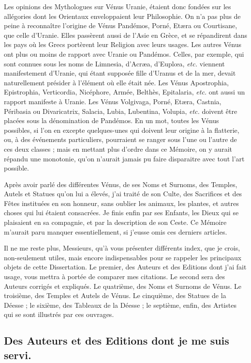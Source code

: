 \documentclass[a4paper, 11pt, oneside, polutonikogreek, french]{article}
\begin{document}
Les opinions des Mythologues sur Vénus Uranie, étaient donc fondées sur les allégories dont les Orientaux enveloppaient leur Philosophie. On n'a pas plus de peine à reconnaître l'origine de Vénus Pandémos, Porné, Etæra ou Courtisane, que celle d'Uranie. Elles passèrent aussi de l'Asie en Grèce, et se répandirent dans les pays où les Grecs portèrent leur Religion avec leurs usages. Les autres Vénus ont plus ou moins de rapport avec Uranie ou Pandémos. Celles, par exemple, qui sont connues sous les noms de Limnesia, d'Acræa, d'Euplœa, \emph{etc.} viennent manifestement d'Uranie, qui étant supposée fille d'Uranus et de la mer, devait naturellement présider à l'élément où elle était née. Les Vénus Apostrophia, Epistrophia, Verticordia, Nicéphore, Armée, Belthès, Epitalaria, \emph{etc.} ont aussi un rapport manifeste à Uranie. Les Vénus Volgivaga, Porné, Etæra, Castnia, Péribasia ou Divaricatrix, Salacia, Lubia, Lubentina, Volupia, \emph{etc.} doivent être placées sous la dénomination de Pandémos. En un mot, toutes les Vénus possibles, si l'on en excepte quelques-unes qui doivent leur origine à la flatterie, ou, à des événements particuliers, pourraient se ranger sous l'une ou l'autre de ces deux classes ; mais en mettant plus d'ordre dans ce Mémoire, on y aurait répandu une monotonie, qu'on n'aurait jamais pu faire disparaitre avec tout l'art possible.

Après avoir parlé des différentes Vénus, de ses Noms et Surnoms, des Temples, Autels et Statues qu'on lui a élevés, j'ai traité de son Culte, des Sacrifices et des Fêtes instituées en son honneur, sans oublier les animaux, les plantes, et autres choses qui lui étaient consacrées. Je finis enfin par ses Enfants, les Dieux qui se plaisaient en sa compagnie, et par la description de son Ceste. Ce Mémoire m'aurait paru manquer essentiellement, si j'eusse omis ces derniers articles.

Il ne me reste plus, Messieurs, qu'à vous présenter différents index, que je crois, non-seulement utiles, mais encore indispensables pour se rappeler les principaux objets de cette Dissertation. Le premier, des Auteurs et des Editions dont j'ai fait usage, vous mettra à portée de comparer mes citations. Le second sera des Auteurs corrigés et expliqués. Le quatrième, des Noms et Surnoms de Vénus. Le troisième, des Temples et Autels de Vénus. Le cinquième, des Statues de la Déesse ; le sixième, des Tableaux de la Déesse ; le septième, enfin, des Artistes qui se sont illustrés par ces ouvrages.
\clearpage
\subsection*{Des Auteurs et des Editions dont je me suis servi.}
\end{document}
